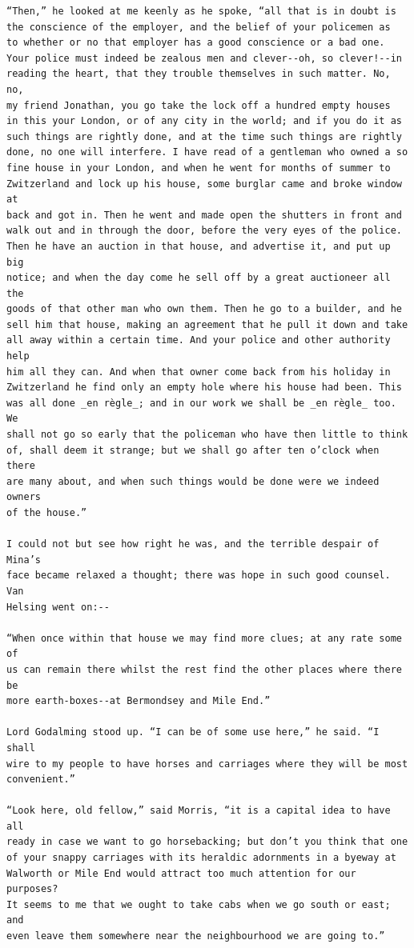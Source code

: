 \documentclass{article}
\begin{document}
\begin{verbatim}
“Then,” he looked at me keenly as he spoke, “all that is in doubt is
the conscience of the employer, and the belief of your policemen as
to whether or no that employer has a good conscience or a bad one.
Your police must indeed be zealous men and clever--oh, so clever!--in
reading the heart, that they trouble themselves in such matter. No, no,
my friend Jonathan, you go take the lock off a hundred empty houses
in this your London, or of any city in the world; and if you do it as
such things are rightly done, and at the time such things are rightly
done, no one will interfere. I have read of a gentleman who owned a so
fine house in your London, and when he went for months of summer to
Zwitzerland and lock up his house, some burglar came and broke window at
back and got in. Then he went and made open the shutters in front and
walk out and in through the door, before the very eyes of the police.
Then he have an auction in that house, and advertise it, and put up big
notice; and when the day come he sell off by a great auctioneer all the
goods of that other man who own them. Then he go to a builder, and he
sell him that house, making an agreement that he pull it down and take
all away within a certain time. And your police and other authority help
him all they can. And when that owner come back from his holiday in
Zwitzerland he find only an empty hole where his house had been. This
was all done _en règle_; and in our work we shall be _en règle_ too. We
shall not go so early that the policeman who have then little to think
of, shall deem it strange; but we shall go after ten o’clock when there
are many about, and when such things would be done were we indeed owners
of the house.”

I could not but see how right he was, and the terrible despair of Mina’s
face became relaxed a thought; there was hope in such good counsel. Van
Helsing went on:--

“When once within that house we may find more clues; at any rate some of
us can remain there whilst the rest find the other places where there be
more earth-boxes--at Bermondsey and Mile End.”

Lord Godalming stood up. “I can be of some use here,” he said. “I shall
wire to my people to have horses and carriages where they will be most
convenient.”

“Look here, old fellow,” said Morris, “it is a capital idea to have all
ready in case we want to go horsebacking; but don’t you think that one
of your snappy carriages with its heraldic adornments in a byeway at
Walworth or Mile End would attract too much attention for our purposes?
It seems to me that we ought to take cabs when we go south or east; and
even leave them somewhere near the neighbourhood we are going to.”


\end{verbatim}
\end{document}
